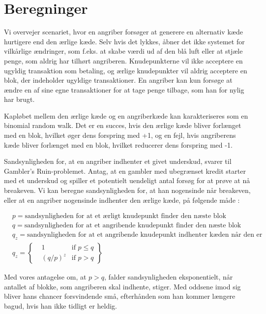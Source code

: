 \documentclass{article}
\begin{document}
\section{Beregninger}\label{sec:calculations}
Vi overvejer scenariet, hvor en angriber forsøger at generere en alternativ kæde hurtigere end den ærlige kæde. Selv hvis det lykkes, åbner det ikke systemet for vilkårlige
ændringer, som f.eks. at skabe værdi ud af den blå luft eller at stjæle penge, som aldrig har tilhørt angriberen. Knudepunkterne vil ikke acceptere en ugyldig transaktion
som betaling, og ærlige knudepunkter vil aldrig acceptere en blok, der indeholder ugyldige transaktioner. En angriber kan kun forsøge at ændre en af sine egne transaktioner
for at tage penge tilbage, som han for nylig har brugt.

Kapløbet mellem den ærlige kæde og en angriberkæde kan karakteriseres som en binomial random walk. Det er en succes, hvis den ærlige kæde bliver forlænget med en blok,
hvilket øger dens forspring med +1, og en fejl, hvis angriberens kæde bliver forlænget med en blok, hvilket reducerer dens forspring med -1.

Sandsynligheden for, at en angriber indhenter et givet underskud, svarer til Gambler's Ruin-problemet. Antag, at en gambler med ubegrænset kredit starter med et underskud og
spiller et potentielt uendeligt antal forsøg for at prøve at nå breakeven. Vi kan beregne sandsynligheden for, at han nogensinde når breakeven, eller at en angriber nogensinde
indhenter den ærlige kæde, på følgende måde \cite{fellerintroduction}:

\[
    \begin{aligned}
        & p = \text{sandsynligheden for at et ærligt knudepunkt finder den næste blok} \\
        & q = \text{sandsynligheden for at et angribende knudepunkt finder den næste blok} \\
        & q_z = \text{sandsynligheden for at et angribende knudepunkt indhenter kæden når den er z blokke bagud} \\
        & q_z = \left\{\begin{aligned}
                &1 & \text{if } p \le q \\
                &{(q / p)}^z & \text{if } p > q
                \end{aligned}\right\}
    \end{aligned}
\]

Med vores antagelse om, at $p > q$, falder sandsynligheden eksponentielt, når antallet af blokke, som angriberen skal indhente, stiger. Med oddsene imod sig bliver hans chancer
forsvindende små, efterhånden som han kommer længere bagud, hvis han ikke tidligt er heldig.
\end{document}
